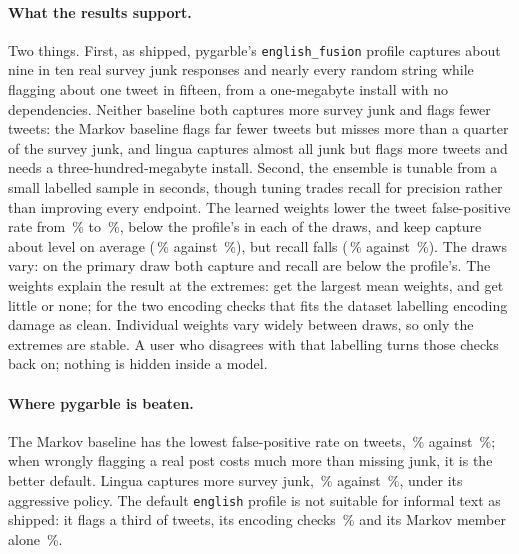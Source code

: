 \documentclass[10pt,twocolumn]{article}
\newcommand{\code}[1]{\texttt{#1}}
\begin{document}
\paragraph{What the results support.} Two things. First, as shipped,
pygarble's \code{english\_fusion} profile captures about nine in ten real
survey junk responses and nearly every random string while flagging about
one tweet in fifteen, from a one-megabyte install with no dependencies.
Neither baseline both captures more survey junk and flags fewer tweets: the Markov baseline
flags far fewer tweets but misses more than a quarter of the survey junk,
and lingua captures almost all junk but flags more tweets and needs a
three-hundred-megabyte install. Second, the ensemble is tunable from a
small labelled sample in seconds, though tuning trades recall for
precision rather than improving every endpoint. The learned weights lower
the tweet false-positive rate from \,\%
to \,\%, below the profile's in each of the
\tuningdraws{} draws, and keep capture about level on average
(\,\% against
\,\%), but recall falls
(\,\% against
\,\%). The draws vary: on the primary
draw both capture and recall are below the profile's. The weights explain
the result at the extremes:
\tuningtop{} get the largest mean weights, and \tuningbottom{} get little
or none; for the two encoding checks that fits the dataset labelling
encoding damage as clean. Individual weights vary widely between draws,
so only the extremes are stable. A user who disagrees with that
labelling turns those checks back on; nothing is hidden inside a model.

\paragraph{Where pygarble is beaten.} The Markov baseline has the lowest
false-positive rate on tweets, \,\%
against \,\%; when wrongly flagging a real
post costs much more than missing junk, it is the better default. Lingua
captures more survey junk, \,\% against
\,\%, under its aggressive policy. The
default \code{english} profile is not suitable for informal text as
shipped: it flags a third of tweets, its encoding checks
\englishencodingpct\,\% and its Markov member alone \englishmarkovpct\,\%.
\end{document}
